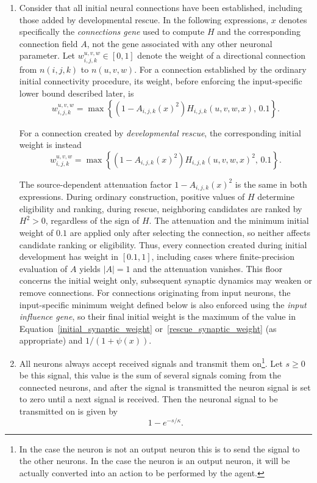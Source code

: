 \documentclass[12pt,a4paper]{article}
\begin{document}
\begin{enumerate}
	\item Consider that all initial neural connections have been established, including those added by developmental rescue. In the following expressions, $x$ denotes specifically the \emph{connections gene} used to compute $H$ and the corresponding connection field $A$, not the gene associated with any other neuronal parameter. Let $w_{i,j,k}^{u,v,w}\in[0,1]$ denote the weight of a directional connection from $n(i,j,k)$ to $n(u,v,w)$. For a connection established by the ordinary initial connectivity procedure, its weight, before enforcing the input-specific lower bound described later, is
	\begin{equation}
		w_{i,j,k}^{u,v,w}=\max\!\left\{\left(1-A_{i,j,k}(x)^2\right)H_{i,j,k}(u,v,w,x),\,0.1\right\}.
		\label{initial_synaptic_weight}
	\end{equation}

	For a connection created by \emph{developmental rescue}, the corresponding initial weight is instead
	\begin{equation}
		w_{i,j,k}^{u,v,w}=\max\!\left\{\left(1-A_{i,j,k}(x)^2\right)H_{i,j,k}(u,v,w,x)^2,\,0.1\right\}.
		\label{rescue_synaptic_weight}
	\end{equation}

	The source-dependent attenuation factor $1-A_{i,j,k}(x)^2$ is the same in both expressions. During ordinary construction, positive values of $H$ determine eligibility and ranking, during rescue, neighboring candidates are ranked by $H^2>0$, regardless of the sign of $H$. The attenuation and the minimum initial weight of $0.1$ are applied only after selecting the connection, so neither affects candidate ranking or eligibility. Thus, every connection created during initial development has weight in $[0.1,1]$, including cases where finite-precision evaluation of $A$ yields $|A|=1$ and the attenuation vanishes. This floor concerns the initial weight only, subsequent synaptic dynamics may weaken or remove connections. For connections originating from input neurons, the input-specific minimum weight defined below is also enforced using the \emph{input influence gene}, so their final initial weight is the maximum of the value in Equation~\ref{initial_synaptic_weight} or~\ref{rescue_synaptic_weight} (as appropriate) and $1/(1+\psi(x))$.

	\item All neurons always accept received signals and transmit them on\footnote{In the case the neuron is not an output neuron this is to send the signal to the other neurons. In the case the neuron is an output neuron, it will be actually converted into an action to be performed by the agent.}. Let $s \geq 0$ be this signal, this value is the sum of several signals coming from the connected neurons, and after the signal is transmitted the neuron signal is set to zero until a next signal is received. Then the neuronal signal to be transmitted on is given by
	$$1 - e^{-s/\kappa}.$$
	

\end{enumerate}
\end{document}
